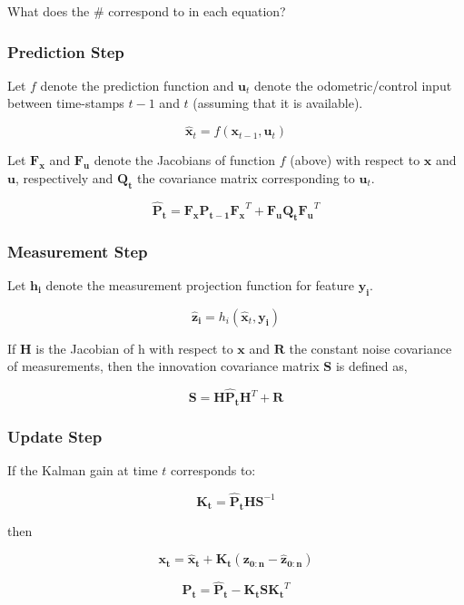 \documentclass[12pt]{article}
\renewcommand{\vec}[1]{\mathbf{#1}}
\begin{document}
\noindent What does the \# correspond to in each equation?

\subsubsection*{Prediction Step}

Let $f$ denote the prediction function and $\vec{u}_t$ denote the odometric/control input between time-stamps $t−1$ and $t$ (assuming that it is available).

\begin{equation}
	\vec{\hat{x}}_t = f(\vec{x}_{t-1}, \vec{u}_t)
\end{equation}

\noindent Let $\mathbf{F_x}$ and $\mathbf{F_u}$ denote the Jacobians of function $f$ (above) with respect to $\vec{x}$ and $\vec{u}$, respectively and $\mathbf{Q_t}$ the covariance matrix corresponding to $\vec{u}_t$.

\begin{equation}
	\mathbf{\hat{P}_t} = \mathbf{F_x} \mathbf{P_{t-1}} \mathbf{F_x}^T + \mathbf{F_u} \mathbf{Q_t} \mathbf{F_u}^T
\end{equation}

\subsubsection*{Measurement Step}

Let $\vec{h_i}$ denote the measurement projection function for feature $\vec{y_i}$.

\begin{equation}
	\vec{\hat{z}_i} = h_i(\vec{\hat{x}}_t, \vec{y_i})
\end{equation}

\noindent If $\mathbf{H}$ is the Jacobian of h with respect to $\vec{x}$ and $\mathbf{R}$ the constant noise covariance of measurements, then the innovation covariance matrix $\mathbf{S}$ is defined as,

\begin{equation}
	\mathbf{S} = \mathbf{H} \mathbf{\hat{P}_t} \mathbf{H}^T + \mathbf{R}
\end{equation}


\subsubsection*{Update Step}

If the Kalman gain at time $t$ corresponds to:

\begin{equation*}
	\mathbf{K_t} = \mathbf{\hat{P}_t} \mathbf{H} \mathbf{S}^{-1} 
\end{equation*}

\noindent then

\begin{equation}
	\vec{x_t} = \vec{\hat{x}_t} + \mathbf{K_t} (\vec{z_{0:n}} - \vec{\hat{z}_{0:n}})
\end{equation}

\begin{equation}
	\mathbf{P_t} = \mathbf{\hat{P}_t} - \mathbf{K_t} \mathbf{S} \mathbf{K_t}^T
\end{equation}
\end{document}
